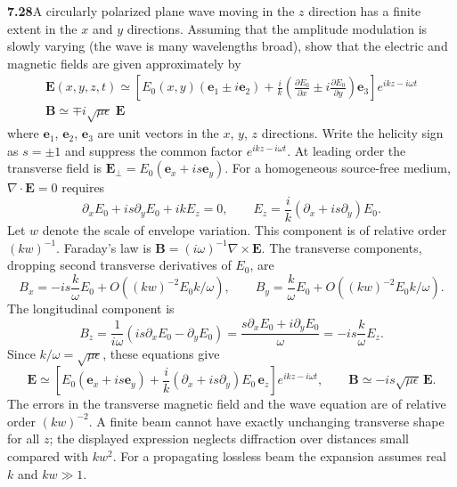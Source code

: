 \par\bigskip
\noindent\textbf{7.28}\quad A circularly polarized plane wave moving in the $z$ direction has a finite extent in the $x$ and $y$ directions. Assuming that the amplitude modulation is slowly varying (the wave is many wavelengths broad), show that the electric and magnetic fields are given approximately by
\begin{gather*}
\mathbf{E}(x,y,z,t)\simeq\left[E_{0}(x,y)(\mathbf{e}_{1}\pm i\mathbf{e}_{2})+\frac{i}{k}\left(\frac{\partial E_{0}}{\partial x}\pm i\frac{\partial E_{0}}{\partial y}\right)\!\mathbf{e}_{3}\right]\!e^{ikz-i\omega t}\\
\mathbf{B}\simeq\mp i\sqrt{\mu\epsilon}\;\mathbf{E}
\end{gather*}
where $\mathbf{e}_{1}$, $\mathbf{e}_{2}$, $\mathbf{e}_{3}$ are unit vectors in the $x$, $y$, $z$ directions.
\solution
Write the helicity sign as $s=\pm1$ and suppress the common factor
$e^{ikz-i\omega t}$. At leading order the transverse field is
$\mathbf E_\perp=E_0(\mathbf e_x+is\mathbf e_y)$.
For a homogeneous source-free medium, $\nabla\cdot\mathbf E=0$
requires
\[
\partial_x E_0+is\partial_y E_0+ikE_z=0,
\qquad
\boxed{E_z=\frac{i}{k}(\partial_x+is\partial_y)E_0.}
\]
Let $w$ denote the scale of envelope variation. This component is
of relative order $(kw)^{-1}$. Faraday's law is
$\mathbf B=(i\omega)^{-1}\nabla\times\mathbf E$.
The transverse components, dropping second transverse derivatives
of $E_0$, are
\[
B_x=-is\frac{k}{\omega}E_0+O((kw)^{-2}E_0k/\omega),\qquad
B_y=\frac{k}{\omega}E_0+O((kw)^{-2}E_0k/\omega).
\]
The longitudinal component is
\[
B_z=\frac1{i\omega}(is\partial_x E_0-\partial_y E_0)
=\frac{s\partial_x E_0+i\partial_y E_0}{\omega}
=-is\frac{k}{\omega}E_z.
\]
Since $k/\omega=\sqrt{\mu\epsilon}$, these equations give
\[
\boxed{\mathbf E\simeq
\left[E_0(\mathbf e_x+is\mathbf e_y)
+\frac{i}{k}(\partial_x+is\partial_y)E_0\,\mathbf e_z\right]
 e^{ikz-i\omega t},\qquad
\mathbf B\simeq-is\sqrt{\mu\epsilon}\,\mathbf E.}
\]
The errors in the transverse magnetic field and the wave equation
are of relative order $(kw)^{-2}$. A finite beam cannot have exactly
unchanging transverse shape for all $z$; the displayed expression
neglects diffraction over distances small compared with $kw^2$.
For a propagating lossless beam the expansion assumes real $k$ and
$kw\gg1$.

